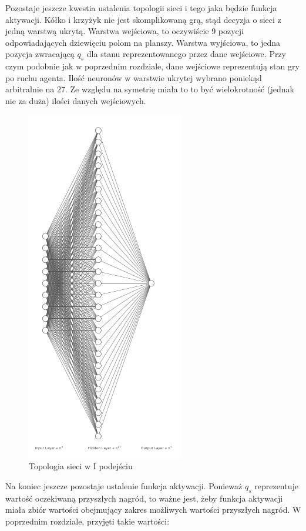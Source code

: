 \documentclass[licencjacka]{pracamgr}
\begin{document}
Pozostaje jeszcze kwestia ustalenia topologii sieci i tego jaka będzie funkcja aktywacji. Kółko i krzyżyk nie jest skomplikowaną grą, stąd decyzja o sieci z jedną warstwą ukrytą. Warstwa wejściowa, to oczywiście 9 pozycji odpowiadających dziewięciu polom na planszy. Warstwa wyjściowa, to jedna pozycja zwracającą $q_{s}$ dla stanu reprezentowanego przez dane wejściowe. Przy czym podobnie jak w poprzednim rozdziale, dane wejściowe reprezentują stan gry po ruchu agenta. Ilość neuronów w warstwie ukrytej wybrano poniekąd arbitralnie na $27$. Ze względu na symetrię miała to to być  wielokrotność (jednak nie za duża) ilości danych wejściowych. 

\begin{figure}[h!]
	\includegraphics [scale=0.5]{nn_1pod.png}
	\caption{Topologia sieci w I podejściu}
	\label{Rys23}
\end{figure}


 Na koniec jeszcze pozostaje ustalenie funkcja aktywacji. Ponieważ $q_{s}$ reprezentuje wartość oczekiwaną przyszłych nagród, to ważne jest, żeby funkcja aktywacji miała zbiór wartości obejmujący zakres możliwych wartości przyszłych nagród. W poprzednim rozdziale, przyjęti takie wartości:
\end{document}
